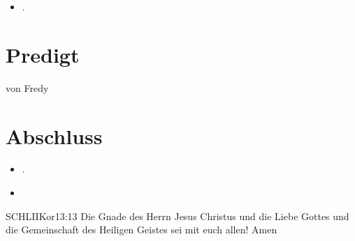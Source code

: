 \documentclass[fontsize=14pt]{mybib}
\newcommand{\Name}{Fredy}
\begin{document}
  

\begin{itemize}
    \item {}.
\end{itemize}
\section{Predigt}
    von \Name
\section{Abschluss}
\begin{itemize}
    \item {}.
    \item {}
\end{itemize}
\begin{bibelbox}{SCHL}{IIKor}{13:13}
    Die Gnade des Herrn Jesus Christus und die Liebe Gottes und die Gemeinschaft des Heiligen Geistes sei mit euch allen! Amen
\end{bibelbox}
\end{document}
